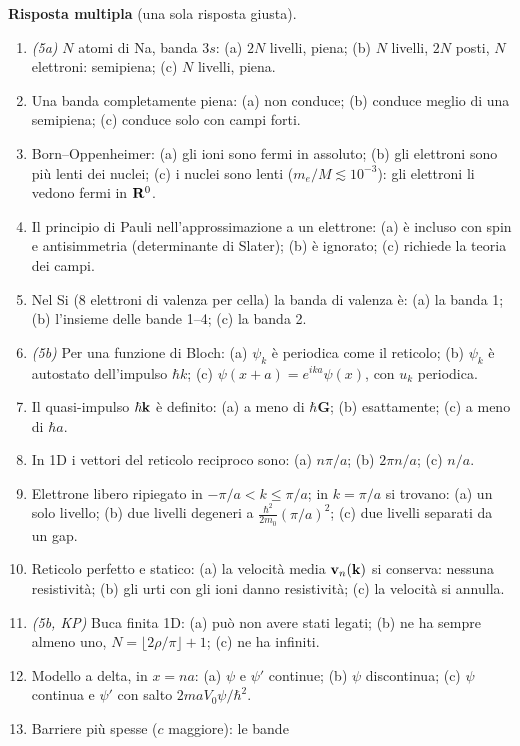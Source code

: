 \documentclass[11pt,a4paper]{article}
\begin{document}
\textbf{Risposta multipla} (una sola risposta giusta).
\begin{enumerate}[label=\textbf{R\arabic*.}, leftmargin=2.3em, itemsep=2pt]
\item \emph{(5a)} $N$ atomi di Na, banda $3s$:
(a) $2N$ livelli, piena; (b) $N$ livelli, $2N$ posti, $N$ elettroni: semipiena; (c) $N$ livelli, piena.
\item Una banda completamente piena:
(a) non conduce; (b) conduce meglio di una semipiena; (c) conduce solo con campi forti.
\item Born--Oppenheimer:
(a) gli ioni sono fermi in assoluto; (b) gli elettroni sono più lenti dei nuclei; (c) i nuclei sono lenti ($m_e/M\lesssim10^{-3}$): gli elettroni li vedono fermi in $\mathbf R^0$.
\item Il principio di Pauli nell'approssimazione a un elettrone:
(a) è incluso con spin e antisimmetria (determinante di Slater); (b) è ignorato; (c) richiede la teoria dei campi.
\item Nel Si (8 elettroni di valenza per cella) la banda di valenza è:
(a) la banda 1; (b) l'insieme delle bande 1--4; (c) la banda 2.
\item \emph{(5b)} Per una funzione di Bloch:
(a) $\psi_k$ è periodica come il reticolo; (b) $\psi_k$ è autostato dell'impulso $\hbar k$; (c) $\psi(x+a)=e^{ika}\psi(x)$, con $u_k$ periodica.
\item Il quasi-impulso $\hbar\mathbf k$ è definito:
(a) a meno di $\hbar\mathbf G$; (b) esattamente; (c) a meno di $\hbar a$.
\item In 1D i vettori del reticolo reciproco sono:
(a) $n\pi/a$; (b) $2\pi n/a$; (c) $n/a$.
\item Elettrone libero ripiegato in $-\pi/a<k\le\pi/a$; in $k=\pi/a$ si trovano:
(a) un solo livello; (b) due livelli degeneri a $\frac{\hbar^2}{2m_0}(\pi/a)^2$; (c) due livelli separati da un gap.
\item Reticolo perfetto e statico:
(a) la velocità media $\mathbf v_n(\mathbf k)$ si conserva: nessuna resistività; (b) gli urti con gli ioni danno resistività; (c) la velocità si annulla.
\item \emph{(5b, KP)} Buca finita 1D:
(a) può non avere stati legati; (b) ne ha sempre almeno uno, $N=\lfloor2\rho/\pi\rfloor+1$; (c) ne ha infiniti.
\item Modello a delta, in $x=na$:
(a) $\psi$ e $\psi'$ continue; (b) $\psi$ discontinua; (c) $\psi$ continua e $\psi'$ con salto $2maV_0\psi/\hbar^2$.
\item Barriere più spesse ($c$ maggiore): le bande

\end{enumerate}
\end{document}
